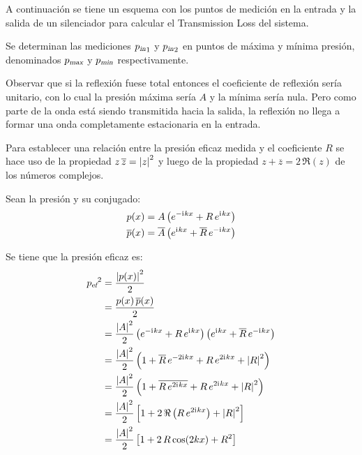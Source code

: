 \documentclass[a5paper,12pt,twoside]{book}
\begin{document}
A continuación se tiene un esquema con los puntos de medición en la entrada y la salida de un silenciador para calcular el Transmission Loss del sistema.

\begin{center}
    \def\svgwidth{0.5\linewidth}
    
\end{center}

Se determinan las mediciones ${{p}_\textsl{{in}}}_1$ y ${{p}_\textsl{{in}}}_2$ en puntos de máxima y mínima presión, denominados ${{p}_\textsl{{max}}}$ y ${{p}_\textsl{{min}}}$ respectivamente.

Observar que si la reflexión fuese total entonces el coeficiente de reflexión sería unitario, con lo cual la presión máxima sería $A$ y la mínima sería nula. Pero como parte de la onda está siendo transmitida hacia la salida, la reflexión no llega a formar una onda completamente estacionaria en la entrada.

Para establecer una relación entre la presión eficaz medida y el coeficiente $R$ se hace uso de la propiedad $z \, \overline{z} = {\left| {z} \right|}^2$ y luego de la propiedad $z + \overline{z} = 2\,\Re(z)$ de los números complejos.

Sean la presión y su conjugado:
\begin{align*}
    p(x) &= A \left( e^{-\mathrm{i}\mkern1mu k x} + R \, e^{\mathrm{i}\mkern1mu k x} \right)
    \\
    \overline{p}(x) &= \overline{A} \left( e^{\mathrm{i}\mkern1mu k x} + \overline{R} \, e^{-\mathrm{i}\mkern1mu k x} \right)
\end{align*}

Se tiene que la presión eficaz es:
\begin{align*}
    {{{p}_\textsl{{ef}}}}^2 &= \frac{{\left| {p(x)} \right|}^2}{2}
    \\
    &= \frac{p(x) \, \overline{p}(x)}{2}
    \\
    &= \frac{{\left| {A} \right|}^2}{2} \left( e^{-\mathrm{i}\mkern1mu k x} + R \, e^{\mathrm{i}\mkern1mu k x} \right) \left( e^{\mathrm{i}\mkern1mu k x} + \overline{R} \, e^{-\mathrm{i}\mkern1mu k x} \right)
    \\
    &= \frac{{\left| {A} \right|}^2}{2} \left( 1 + \overline{R} \, e^{-2\mathrm{i}\mkern1mu k x} + R \, e^{2\mathrm{i}\mkern1mu k x} + {\left| {R} \right|}^2  \right)
    \\
    &= \frac{{\left| {A} \right|}^2}{2} \left( 1 + \overline{R \, e^{2\mathrm{i}\mkern1mu k x}} + R \, e^{2\mathrm{i}\mkern1mu k x} + {\left| {R} \right|}^2  \right)
    \\
    &= \frac{{\left| {A} \right|}^2}{2} \left[ 1 + 2\,\Re \left( R\,e^{2\mathrm{i}\mkern1mu k x} \right) + {\left| {R} \right|}^2 \right]
    \\
    &= \frac{{\left| {A} \right|}^2}{2} \left[ 1 + 2 \, R \cos(2kx) + R^2 \right]
\end{align*}
\end{document}
